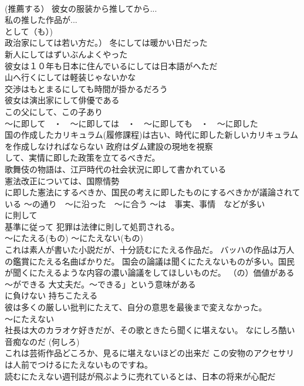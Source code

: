 \documentclass[8pt]{extreport}
\begin{document}
\begin{CJK}{UTF8}{min}
\\	(推薦する） 彼女の服装から推してから... 
\\	私の推した作品が... 
\\	として（も）) 
\\	政治家にしては若い方だ。） 冬にしては暖かい日だった 
\\	新人にしてはずいぶんよくやった 
\\	彼女は１０年も日本に住んでいるにしては日本語がへただ 
\\	山へ行くにしては軽装じゃないかな 
\\	交渉はもとまるにしても時間が掛かるだろう 
\\	彼女は演出家にして俳優である 
\\	この父にして、この子あり 
\\	～に即して　・　～に即しては　・　～に即しても　・　～に即した	
\\	国の作成したカリキュラム(履修課程)は古い、時代に即した新しいカリキュラムを作成しなければならない 政府はダム建設の現地を視察
\\	して、実情に即した政策を立てるべきだ。　
\\	歌舞伎の物語は、江戸時代の社会状況に即して書かれている 
\\	憲法改正については、国際情勢
\\	に即した憲法にするべきか、国民の考えに即したものにするべきかが議論されている	～の通り　～に沿った　～に合う ～は　事実、事情　などが多い 
\\	に則して 
\\	基準に従って 犯罪は法律に則して処罰される。
\\	～にたえる(もの) ～にたえない(もの)	
\\	これは素人が書いた小説だが、十分読むにたえる作品だ。 バッハの作品は万人の鑑賞にたえる名曲ばかりだ。 国会の論議は聞くにたえないものが多い。国民が聞くにたえるような内容の濃い論議をしてほしいものだ。	（の）価値がある　　～ができる 大丈夫だ。～できる」という意味がある 
\\	に負けない 持ちこたえる
\\	彼は多くの厳しい批判にたえて、自分の意思を最後まで変えなかった。
\\	～にたえない	
\\	社長は大のカラオケ好きだが、その歌ときたら聞くに堪えない。 なにしろ酷い音痴なのだ (何しろ) 
\\	これは芸術作品どころか、見るに堪えないほどの出来だ この安物のアクセサリは人前でつけるにたえないものですね。
\\	読むにたえない週刊誌が飛ぶように売れているとは、日本の将来が心配だ 

\end{CJK}
\end{document}
